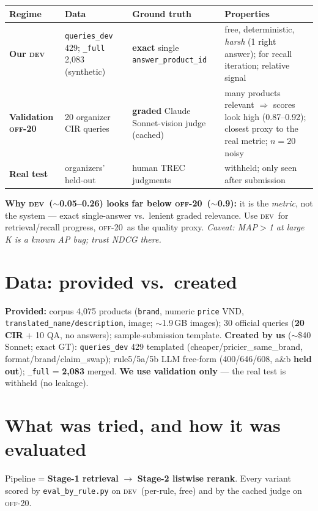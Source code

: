 \documentclass[10pt]{article}
\newcommand{\dev}{\textsc{dev}}
\newcommand{\off}{\textsc{off-20}}
\begin{document}
\begin{table}[h]\centering\small
\begin{tabular}{@{}p{2.4cm}p{3.1cm}p{3.0cm}p{4.4cm}@{}}
\toprule
Regime & Data & Ground truth & Properties \\
\midrule
\textbf{Our \dev} & \texttt{queries\_dev} 429; \texttt{\_full} 2{,}083 (synthetic) & \textbf{exact} single
\texttt{answer\_product\_id} & free, deterministic, \emph{harsh} (1 right answer); for recall iteration; relative signal \\
\addlinespace
\textbf{Validation \off} & 20 organizer CIR queries & \textbf{graded} Claude Sonnet-vision judge (cached) &
many products relevant $\Rightarrow$ scores look high (0.87--0.92); closest proxy to the real metric; $n{=}20$ noisy \\
\addlinespace
\textbf{Real test} & organizers' held-out & human TREC judgments & withheld; only seen after submission \\
\bottomrule
\end{tabular}
\end{table}
\textbf{Why \dev\ ($\sim$0.05--0.26) looks far below \off\ ($\sim$0.9):} it is the \emph{metric}, not the
system --- exact single-answer vs.\ lenient graded relevance. Use \dev\ for retrieval/recall progress,
\off\ as the quality proxy. \emph{Caveat: MAP$>$1 at large K is a known AP bug; trust NDCG there.}

\section{Data: provided vs.\ created}
\textbf{Provided:} corpus 4{,}075 products (\texttt{brand}, numeric \texttt{price} VND,
\texttt{translated\_name/description}, image; $\sim$1.9\,GB images); 30 official queries (\textbf{20 CIR}
+ 10 QA, no answers); sample-submission template. \textbf{Created by us} ($\sim$\$40 Sonnet; exact GT):
\texttt{queries\_dev} 429 templated (cheaper/pricier\_same\_brand, format/brand/claim\_swap);
rule5/5a/5b LLM free-form (400/646/608, a\&b \textbf{held out}); \texttt{\_full} = \textbf{2{,}083} merged.
\textbf{We use validation only} --- the real test is withheld (no leakage).

\section{What was tried, and how it was evaluated}
Pipeline = \textbf{Stage-1 retrieval} $\to$ \textbf{Stage-2 listwise rerank}. Every variant scored by
\texttt{eval\_by\_rule.py} on \dev\ (per-rule, free) and by the cached judge on \off.
\end{document}
